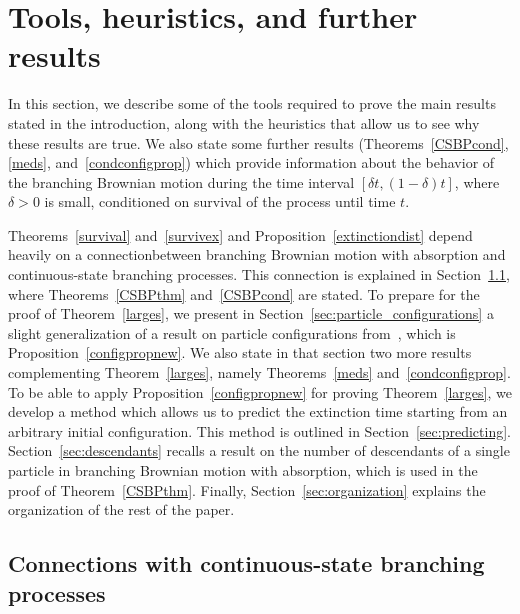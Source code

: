 \documentclass[AHL,Unicode,longabstracts,published]{cedram}
\newcommand{\1} {\mathds{1}}
\begin{document}
\section{Tools, heuristics, and further results}

In this section, we describe some of the tools required to prove the main results stated in the introduction, along with the heuristics that allow us to see why these results are true. We also state some further results (Theorems~\ref{CSBPcond}, \ref{meds}, and~\ref{condconfigprop}) which provide information about the behavior of the branching Brownian motion during the time interval $[\delta t, (1 - \delta)t]$, where $\delta > 0$ is small, conditioned on survival of the process until time $t$.

Theorems~\ref{survival} and~\ref{survivex} and Proposition~\ref{extinctiondist} depend heavily on a connection\linebreak between branching Brownian motion with absorption and continuous-state branching processes. This connection is explained in Section~\ref{CSBPintro}, where Theorems~\ref{CSBPthm} and~\ref{CSBPcond} are stated. To prepare for the proof of Theorem~\ref{larges}, we present in Section~\ref{sec:particle_configurations} a slight generalization of a result on particle configurations from~\cite{bbs3}, which is Proposition~\ref{configpropnew}. We also state in that section two more results complementing Theorem~\ref{larges}, namely Theorems~\ref{meds} and~\ref{condconfigprop}. To be able to apply Proposition~\ref{configpropnew} for proving Theorem~\ref{larges}, we develop a method which allows us to predict the extinction time starting from an arbitrary initial configuration. This method is outlined in Section~\ref{sec:predicting}. Section~\ref{sec:descendants} recalls a result on the number of descendants of a single particle in branching Brownian motion with absorption, which is used in the proof of Theorem~\ref{CSBPthm}. Finally, Section~\ref{sec:organization} explains the organization of the rest of the paper.

\subsection{Connections with continuous-state branching processes}\label{CSBPintro}
\end{document}
